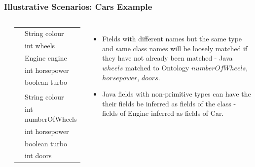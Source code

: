 \documentclass{beamer}
\begin{document}
\begin{frame}
  \frametitle{Illustrative Scenarios: Cars Example}
    \begin{columns}[t]
      \column{.4\paperwidth}
      \begin{table}[h]
      \centering
      \label{my-label}
      \begin{tabular}{|c|l|}
      \hline
      \rowcolor[HTML]{FFCCC9} 
      \multicolumn{2}{|c|}{\cellcolor[HTML]{FFCCC9}Java}                    \\ \hline
      \rowcolor[HTML]{FFCCC9} 
      \cellcolor[HTML]{FFCCC9}                         & String colour      \\ \cline{2-2} 
      \rowcolor[HTML]{FFCCC9} 
      \cellcolor[HTML]{FFCCC9}                         & int wheels         \\ \cline{2-2} 
      \rowcolor[HTML]{FFCCC9} 
      \multirow{-3}{*}{\cellcolor[HTML]{FFCCC9}Car}    & Engine engine      \\ \hline
      \rowcolor[HTML]{FFCCC9} 
      \cellcolor[HTML]{FFCCC9}                         & int horsepower     \\ \cline{2-2} 
      \rowcolor[HTML]{FFCCC9} 
      \multirow{-2}{*}{\cellcolor[HTML]{FFCCC9}Engine} & boolean turbo      \\ \hline \hline
      \rowcolor[HTML]{96FFFB} 
      \multicolumn{2}{|c|}{\cellcolor[HTML]{96FFFB}Ontology}                \\ \hline
      \rowcolor[HTML]{96FFFB} 
      \cellcolor[HTML]{96FFFB}                         & String colour      \\ \cline{2-2} 
      \rowcolor[HTML]{96FFFB} 
      \cellcolor[HTML]{96FFFB}                         & int numberOfWheels \\ \cline{2-2} 
      \rowcolor[HTML]{96FFFB} 
      \cellcolor[HTML]{96FFFB}                         & int horsepower     \\ \cline{2-2} 
      \rowcolor[HTML]{96FFFB} 
      \cellcolor[HTML]{96FFFB}                         & boolean turbo      \\ \cline{2-2} 
      \rowcolor[HTML]{96FFFB} 
      \multirow{-5}{*}{\cellcolor[HTML]{96FFFB}Car}    & int doors          \\ \hline
      \end{tabular}
      \end{table}

      \column{.55\paperwidth}
      \begin{itemize}
      \item Fields with different names but the same type and same class names will be loosely matched if they have not already been matched - Java $wheels$ matched to Ontology $numberOfWheels$, $horsepower$, $doors$.
      \item Java fields with non-primitive types can have the their fields be inferred as fields of the class - fields of Engine inferred as fields of Car.
      \end{itemize}
    \end{columns}
\end{frame}
\end{document}
